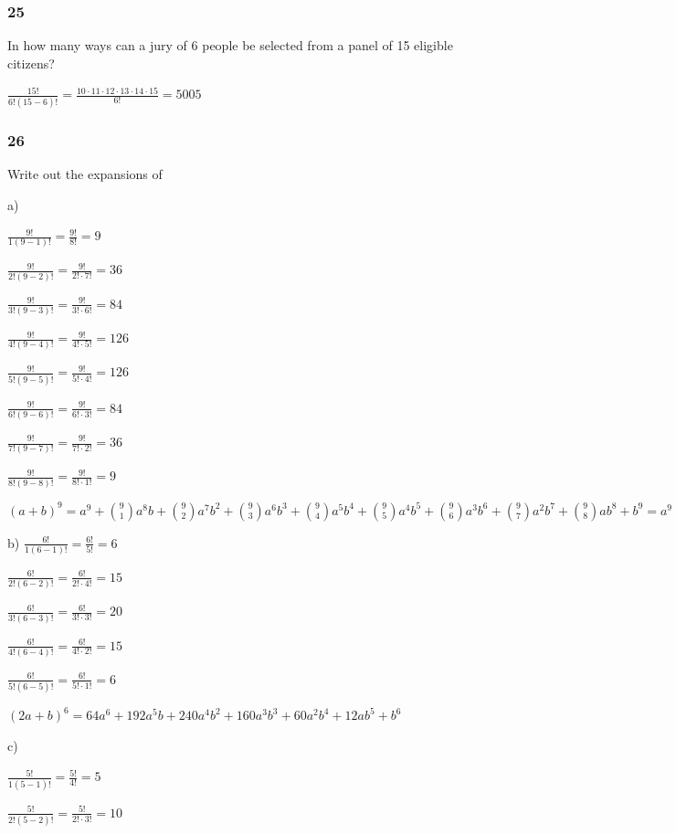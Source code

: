 \documentclass[]{report}
\begin{document}
\subsubsection{25}

In how many ways can a jury of 6 people be selected from a panel of 15 eligible citizens?

$\frac{15!}{6!(15 - 6)!} = \frac{10 \cdot 11 \cdot 12 \cdot 13 \cdot 14 \cdot 15}{6!} = 5005$

\subsubsection{26}
Write out the expansions of 


a)

$\frac{9!}{1(9-1)!} = \frac{9!}{8!} = 9$

$\frac{9!}{2!(9-2)!} = \frac{9!}{2! \cdot 7!} = 36$

$\frac{9!}{3!(9-3)!} = \frac{9!}{3! \cdot 6!} = 84$

$\frac{9!}{4!(9-4)!} = \frac{9!}{4! \cdot 5!} = 126$

$\frac{9!}{5!(9-5)!} = \frac{9!}{5! \cdot 4!} = 126$

$\frac{9!}{6!(9-6)!} = \frac{9!}{6! \cdot 3!} = 84$

$\frac{9!}{7!(9-7)!} = \frac{9!}{7! \cdot 2!} = 36$

$\frac{9!}{8!(9-8)!} = \frac{9!}{8! \cdot 1!} = 9$



 $(a+b)^9= a^9 + {9 \choose 1}a^8b + {9 \choose 2}a^7b^2 + {9 \choose 3}a^6b^3  +  {9 \choose 4}a^5b^4 + {9 \choose 5}a^4b^5+ {9 \choose 6}a^3b^6+ {9 \choose 7}a^2b^7+ {9 \choose 8}ab^8 +  b^9 = a^9 + 9a^8b + 36a^7b^2 + 84a^6b^3 +  126a^5b^4 + 126a^4b^5+ 84a^3b^6+ 36a^2b^7+ 9ab^8 +  b^9$

b) 
$\frac{6!}{1(6-1)!} = \frac{6!}{5!} = 6$

$\frac{6!}{2!(6-2)!} = \frac{6!}{2! \cdot 4!} = 15$

$\frac{6!}{3!(6-3)!} = \frac{6!}{3! \cdot 3!} = 20$

$\frac{6!}{4!(6-4)!} = \frac{6!}{4! \cdot 2!} = 15$

$\frac{6!}{5!(6-5)!} = \frac{6!}{5! \cdot 1!} = 6$

$(2a + b)^6  = 64a^6 + 192a^5b + 240a^4b^2 + 160a^3b^3 + 60a^2b^4 + 12ab^5 + b^6$

c) 

$\frac{5!}{1(5-1)!} = \frac{5!}{4!} = 5$

$\frac{5!}{2!(5-2)!} = \frac{5!}{2! \cdot 3!} = 10$
\end{document}
